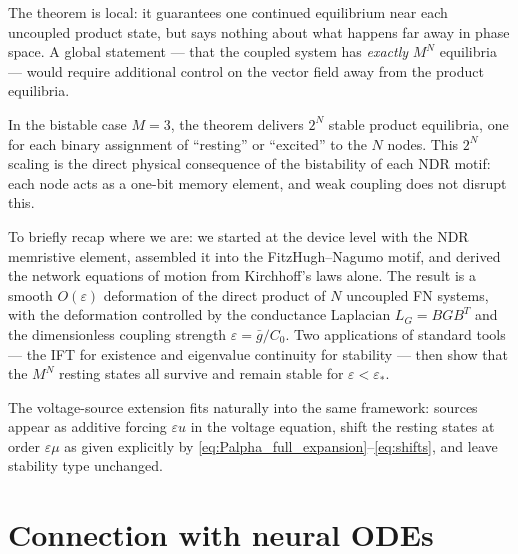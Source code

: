 \documentclass[11pt]{article}
\begin{document}
The theorem is local: it guarantees one continued equilibrium near each
uncoupled product state, but says nothing about what happens far away in
phase space. A global statement --- that the coupled system has
\emph{exactly} $M^N$ equilibria --- would require additional control on
the vector field away from the product equilibria.

In the bistable case $M = 3$, the theorem delivers $2^N$ stable product
equilibria, one for each binary assignment of ``resting'' or
``excited'' to the $N$ nodes. This $2^N$ scaling is the direct
physical consequence of the bistability of each NDR motif: each node
acts as a one-bit memory element, and weak coupling does not disrupt
this.

\medskip
To briefly recap where we are: we started at the device level with the
NDR memristive element, assembled it into the FitzHugh--Nagumo motif,
and derived the network equations of motion from Kirchhoff's laws alone.
The result is a smooth $O(\varepsilon)$ deformation of the direct
product of $N$ uncoupled FN systems, with the deformation controlled by
the conductance Laplacian $L_G = BGB^T$ and the dimensionless coupling
strength $\varepsilon = \bar{g}/C_0$. Two applications of standard
tools --- the IFT for existence and eigenvalue continuity for stability
--- then show that the $M^N$ resting states all survive and remain
stable for $\varepsilon < \varepsilon_*$.

The voltage-source extension fits naturally into the same framework:
sources appear as additive forcing $\varepsilon u$ in the voltage
equation, shift the resting states at order $\varepsilon\mu$ as given
explicitly by \eqref{eq:Palpha_full_expansion}--\eqref{eq:shifts}, and
leave stability type unchanged.


\section{Connection with neural ODEs}
\label{sec:neural_ode_connection}
\end{document}
